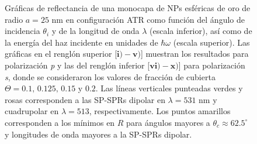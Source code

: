 	\begin{figure}[h!]\centering
{}\vspace*{-.5em}
	\caption{Gráficas de reflectancia de una monocapa de NPs esféricas de oro de radio $a=25$ nm en configuración ATR como función del ángulo de incidencia $\theta_i$ y de la longitud de onda $\lambda$ (escala inferior), así como de la energía del haz incidente en unidades de $\hbar\omega$ (escala superior).  Las gráficas   en el renglón superior [$\mathbf{i)-v)}$] muestran los resultados para  polarización \emph{p} y las del renglón inferior  [$\mathbf{vi)-x)}$]  para polarización  \emph{s}, donde se consideraron los valores de fracción de cubierta $\Theta =  0.1,\,0.125,\,0.15$ y $0.2$.  Las líneas verticales punteadas verdes y rosas corresponden a las SP-SPRs dipolar en $\lambda=531$ nm y  cuadrupolar en $\lambda=513$, respectivamente.  Los puntos amarillos corresponden a los mínimos en $R$ para ángulos mayores a $\theta_c\approx 62.5^\circ$ y longitudes de onda mayores a la SP-SPRs dipolar.
}	\label{fig:Au-R-Theta}	
	\end{figure}	

